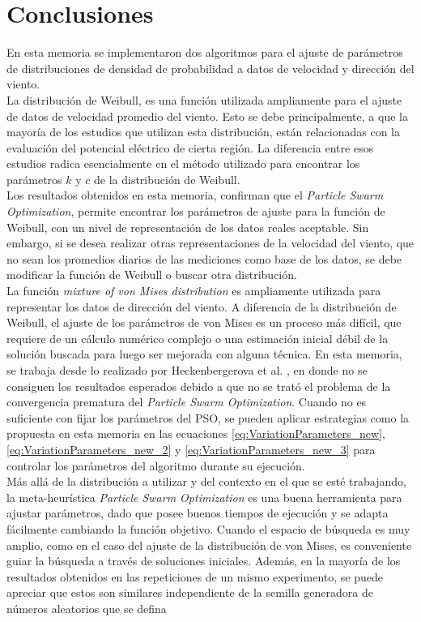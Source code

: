\chapter{Conclusiones}
En esta memoria se implementaron dos algoritmos para el ajuste de parámetros de distribuciones de densidad de probabilidad a datos de velocidad y dirección del viento.\\
La distribución de Weibull, es una función utilizada ampliamente para el ajuste de datos de velocidad promedio del viento. Esto se debe principalmente, a que la mayoría de los estudios que utilizan esta distribución, están relacionadas con la evaluación del potencial eléctrico de cierta región. La diferencia entre esos estudios radica esencialmente en el método utilizado para encontrar los parámetros $k$ y $c$ de la distribución de Weibull.\\
Los resultados obtenidos en esta memoria, confirman que el \emph{Particle Swarm Optimization}, permite encontrar los parámetros de ajuste para la función de Weibull, con un nivel de representación de los datos reales aceptable. Sin embargo, si se desea realizar otras representaciones de la velocidad del viento, que no sean los promedios diarios de las mediciones como base de los datos, se debe modificar la función de Weibull o buscar otra distribución.\\
La función \emph{mixture of von Mises distribution} es ampliamente utilizada para representar los datos de dirección del viento. A diferencia de la distribución de Weibull, el ajuste de los parámetros de von Mises es un proceso más difícil, que requiere de un cálculo numérico complejo o una estimación inicial débil de la solución buscada para luego ser mejorada con alguna técnica. En esta memoria, se trabaja desde lo realizado por Heckenbergerova et al. \cite{Heckenbergerova15}, en donde no se consiguen los resultados esperados debido a que no se trató el problema de la convergencia prematura del \emph{Particle Swarm Optimization}. Cuando no es suficiente con fijar los parámetros del PSO, se pueden aplicar estrategias como la propuesta en esta memoria en las ecuaciones \ref{eq:VariationParameters_new}, \ref{eq:VariationParameters_new_2} y \ref{eq:VariationParameters_new_3} para controlar los parámetros del algoritmo durante su ejecución.\\
Más allá de la distribución a utilizar y del contexto en el que se esté trabajando, la meta-heurística \emph{Particle Swarm Optimization} es una buena herramienta para ajustar parámetros, dado que posee buenos tiempos de ejecución y se adapta fácilmente cambiando la función objetivo. Cuando el espacio de búsqueda es muy amplio, como en el caso del ajuste de la distribución de von Mises, es conveniente guiar la búsqueda a través de soluciones iniciales. Además, en la mayoría de los resultados obtenidos en las repeticiones de un mismo experimento, se puede apreciar que estos son similares independiente de la semilla generadora de números aleatorios que se defina\\
